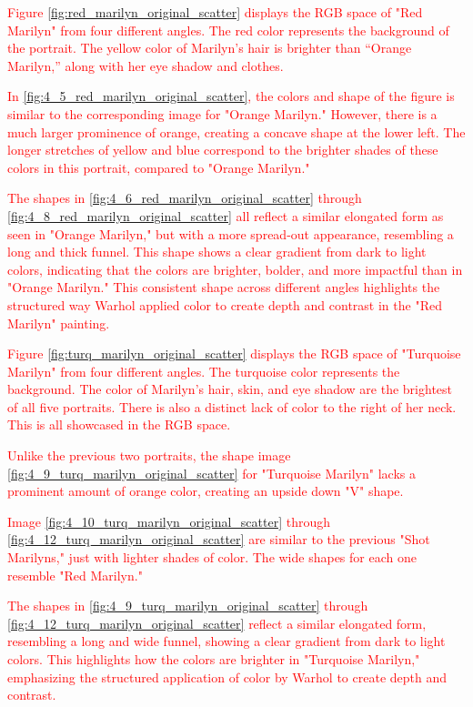 \documentclass{article}
\begin{document}
\textcolor{red}{Figure \ref{fig:red_marilyn_original_scatter} displays the RGB space of "Red Marilyn" from four different
angles. The red color represents the background of the portrait. The
yellow color of Marilyn's hair is brighter than ``Orange Marilyn,''
along with her eye shadow and clothes.}

\textcolor{red}{In \ref{fig:4_5_red_marilyn_original_scatter}, the colors and shape of the figure is similar to the
corresponding image for "Orange Marilyn." However, there is a much
larger prominence of orange, creating a concave shape at the lower left.
The longer stretches of yellow and blue correspond to the brighter
shades of these colors in this portrait, compared to "Orange Marilyn."}

\textcolor{red}{The shapes in \ref{fig:4_6_red_marilyn_original_scatter} through \ref{fig:4_8_red_marilyn_original_scatter} all reflect a similar elongated form as
seen in "Orange Marilyn," but with a more spread-out appearance,
resembling a long and thick funnel. This shape shows a clear gradient
from dark to light colors, indicating that the colors are brighter,
bolder, and more impactful than in "Orange Marilyn." This consistent
shape across different angles highlights the structured way Warhol
applied color to create depth and contrast in the "Red Marilyn"
painting.}



\textcolor{red}{Figure \ref{fig:turq_marilyn_original_scatter} displays the RGB space of "Turquoise Marilyn" from four
different angles. The turquoise color represents the background. The
color of Marilyn's hair, skin, and eye shadow are the brightest of all
five portraits. There is also a distinct lack of color to the right of
her neck. This is all showcased in the RGB space.}

\textcolor{red}{Unlike the previous two portraits, the shape image \ref{fig:4_9_turq_marilyn_original_scatter} for "Turquoise
Marilyn" lacks a prominent amount of orange color, creating an upside
down "V" shape.}

\textcolor{red}{Image \ref{fig:4_10_turq_marilyn_original_scatter} through \ref{fig:4_12_turq_marilyn_original_scatter} are similar to the previous "Shot Marilyns,"
just with lighter shades of color. The wide shapes for each one resemble
"Red Marilyn."}

\textcolor{red}{The shapes in \ref{fig:4_9_turq_marilyn_original_scatter} through \ref{fig:4_12_turq_marilyn_original_scatter} reflect a similar elongated form,
resembling a long and wide funnel, showing a clear gradient from dark to
light colors. This highlights how the colors are brighter in "Turquoise
Marilyn," emphasizing the structured application of color by Warhol to
create depth and contrast.}
\end{document}
